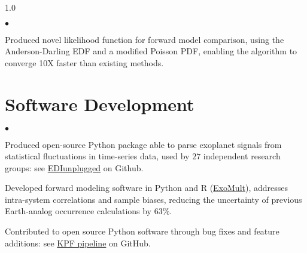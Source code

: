 \documentclass[margin,line, 12pt]{res}
\newenvironment{list2}{
  \begin{list}{$\bullet$}{%
      \setlength{\itemsep}{0.0in}
      \setlength{\parsep}{0in} \setlength{\parskip}{0in}
      \setlength{\topsep}{0.0in} \setlength{\partopsep}{0in}
      \setlength{\leftmargin}{0.2in}}}{\end{list}}
\begin{document}
\begin{spacing}{1.0}
\begin{resume}
\begin{list2}
	\item Produced novel likelihood function for forward model comparison, using the Anderson-Darling EDF and a modified Poisson PDF, enabling the algorithm to converge 10X faster than existing methods.    
	

    \end{list2}
\vspace*{-2mm}

\section{Software Development}
	\begin{list2}
	\item Produced open-source Python package able to parse exoplanet signals from statistical fluctuations in time-series data, used by $27$ independent research groups: see \href{https://github.com/jonzink/EDI_Vetter_unplugged}{EDIunplugged} on Github.
	
	\item Developed forward modeling software in Python and R (\href{https://github.com/jonzink/ExoMult}{ExoMult}), addresses intra-system correlations and sample biases, reducing the uncertainty of previous Earth-analog occurrence calculations by 63\%.
		
	\item Contributed to open source Python software through bug fixes and feature additions: see \href{https://github.com/California-Planet-Search/KPF-CPS}{KPF pipeline} on GitHub.
	\end{list2}
	

\vspace*{-2mm}


\end{resume}
\end{spacing}
\end{document}
